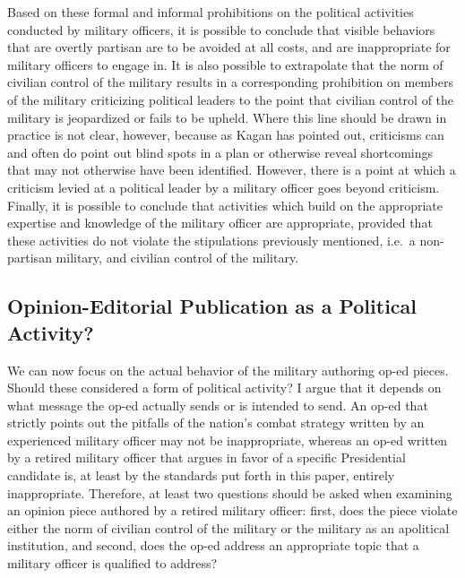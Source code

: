 \documentclass[12pt,]{article}
\begin{document}
Based on these formal and informal prohibitions on the political activities conducted by military officers, it is possible to conclude that visible behaviors that are overtly partisan are to be avoided at all costs, and are inappropriate for military officers to engage in. It is also possible to extrapolate that the norm of civilian control of the military results in a corresponding prohibition on members of the military criticizing political leaders to the point that civilian control of the military is jeopardized or fails to be upheld. Where this line should be drawn in practice is not clear, however, because as Kagan has pointed out, criticisms can and often do point out blind spots in a plan or otherwise reveal shortcomings that may not otherwise have been identified. However, there is a point at which a criticism levied at a political leader by a military officer goes beyond criticism. Finally, it is possible to conclude that activities which build on the appropriate expertise and knowledge of the military officer are appropriate, provided that these activities do not violate the stipulations previously mentioned, i.e.~a non-partisan military, and civilian control of the military.

\hypertarget{opinion-editorial-publication-as-a-political-activity}{%
\subsection{Opinion-Editorial Publication as a Political Activity?}\label{opinion-editorial-publication-as-a-political-activity}}

We can now focus on the actual behavior of the military authoring op-ed pieces. Should these considered a form of political activity? I argue that it depends on what message the op-ed actually sends or is intended to send. An op-ed that strictly points out the pitfalls of the nation's combat strategy written by an experienced military officer may not be inappropriate, whereas an op-ed written by a retired military officer that argues in favor of a specific Presidential candidate is, at least by the standards put forth in this paper, entirely inappropriate. Therefore, at least two questions should be asked when examining an opinion piece authored by a retired military officer: first, does the piece violate either the norm of civilian control of the military or the military as an apolitical institution, and second, does the op-ed address an appropriate topic that a military officer is qualified to address?
\end{document}
